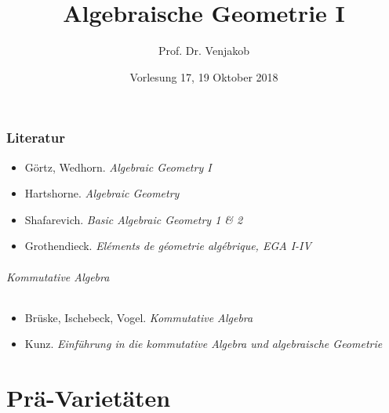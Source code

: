 \documentclass[12pt]{article}
\theoremstyle{definition}
\theoremstyle{definition}
\theoremstyle{plain}
\theoremstyle{plain}
\theoremstyle{plain}
\theoremstyle{remark}
\theoremstyle{plain}
\theoremstyle{remark}
\theoremstyle{definition}
\theoremstyle{plain}
\begin{document}
\title{Algebraische Geometrie I}
\author{Prof. Dr. Venjakob}
\date{Vorlesung 17, 19 Oktober 2018}
\maketitle

\section*{Literatur}
\begin{itemize}
\item Görtz, Wedhorn. \emph{Algebraic Geometry I}
\item Hartshorne. \emph{Algebraic Geometry}
\item Shafarevich. \emph{Basic Algebraic Geometry 1 \& 2}
\item Grothendieck. \emph{Eléments de géometrie algébrique, EGA I-IV}
\end{itemize}

\paragraph{Kommutative Algebra}
\begin{itemize}
\item Brüske, Ischebeck, Vogel. \emph{Kommutative Algebra}
\item Kunz. \emph{Einführung in die kommutative Algebra und algebraische Geometrie}
\end{itemize}

\tableofcontents{}
\newpage{}

\part{Prä-Varietäten}














\end{document}
